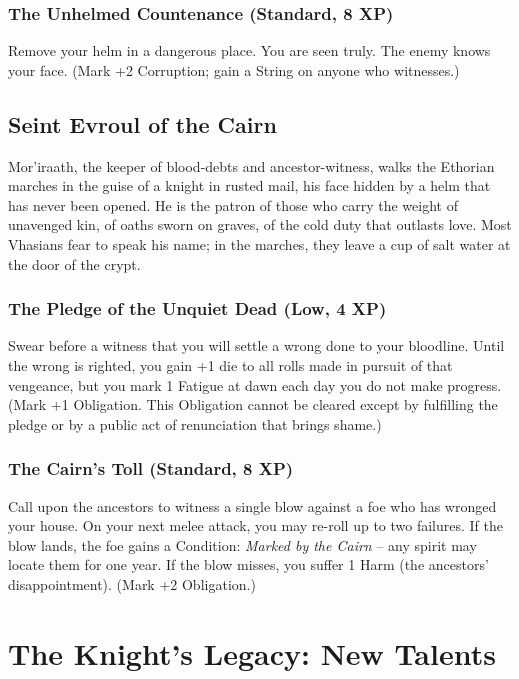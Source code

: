 \documentclass[11pt,twoside]{book}
\begin{document}
\subsection*{The Unhelmed Countenance (Standard, 8 XP)}
Remove your helm in a dangerous place. You are seen truly. The enemy knows your face. (Mark +2 Corruption; gain a String on anyone who witnesses.)

\section{Seint Evroul of the Cairn}
Mor'iraath, the keeper of blood-debts and ancestor-witness, walks the Ethorian marches in the guise of a knight in rusted mail, his face hidden by a helm that has never been opened. He is the patron of those who carry the weight of unavenged kin, of oaths sworn on graves, of the cold duty that outlasts love. Most Vhasians fear to speak his name; in the marches, they leave a cup of salt water at the door of the crypt.

\subsection*{The Pledge of the Unquiet Dead (Low, 4 XP)}
Swear before a witness that you will settle a wrong done to your bloodline. Until the wrong is righted, you gain +1 die to all rolls made in pursuit of that vengeance, but you mark 1 Fatigue at dawn each day you do not make progress. (Mark +1 Obligation. This Obligation cannot be cleared except by fulfilling the pledge or by a public act of renunciation that brings shame.)

\subsection*{The Cairn's Toll (Standard, 8 XP)}
Call upon the ancestors to witness a single blow against a foe who has wronged your house. On your next melee attack, you may re-roll up to two failures. If the blow lands, the foe gains a Condition: \textit{Marked by the Cairn} -- any spirit may locate them for one year. If the blow misses, you suffer 1 Harm (the ancestors' disappointment). (Mark +2 Obligation.)

\chapter{The Knight's Legacy: New Talents}\label{ch:talents}
\end{document}
